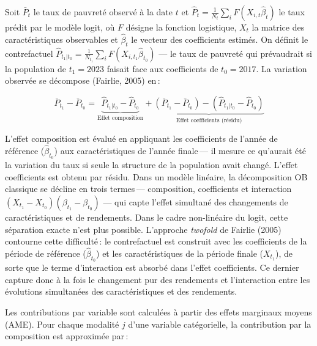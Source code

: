 \documentclass[
  french,
  9pt,
  a4paper,
]{article}
\begin{document}
\begin{tcolorbox}[enhanced jigsaw, leftrule=.75mm, breakable, toptitle=1mm, toprule=.15mm, title={Encadré 3\,--- Formalisation de la décomposition Oaxaca-Blinder}, opacityback=0, arc=.35mm, opacitybacktitle=0.6, colback=white, coltitle=black, colframe=quarto-callout-note-color-frame, left=2mm, colbacktitle=quarto-callout-note-color!10!white, bottomtitle=1mm, titlerule=0mm, rightrule=.15mm, bottomrule=.15mm]

Soit \(\bar{P}_t\) le taux de pauvreté observé à la date \(t\) et
\(\hat{P}_t = \frac{1}{N_t}\sum_i F(X_{i,t} \hat\beta_t)\) le taux
prédit par le modèle logit, où \(F\) désigne la fonction logistique,
\(X_t\) la matrice des caractéristiques observables et \(\hat\beta_t\)
le vecteur des coefficients estimés. On définit le contrefactuel
\(\hat{P}_{t_1|t_0} = \frac{1}{N_{t_1}}\sum_i F(X_{i,t_1} \hat\beta_{t_0})\)
--- le taux de pauvreté qui prévaudrait si la population de
\(t_1 = 2023\) faisait face aux coefficients de \(t_0 = 2017\). La
variation observée se décompose (Fairlie, 2005) en\,:

\[\bar{P}_{t_1} - \bar{P}_{t_0} = \underbrace{\hat{P}_{t_1|t_0} - \hat{P}_{t_0}}_{\text{Effet composition}} + \underbrace{(\bar{P}_{t_1} - \bar{P}_{t_0}) - (\hat{P}_{t_1|t_0} - \hat{P}_{t_0})}_{\text{Effet coefficients (résidu)}}\]

L'effet composition est évalué en appliquant les coefficients de l'année
de référence (\(\hat\beta_{t_0}\)) aux caractéristiques de l'année
finale\,--- il mesure ce qu'aurait été la variation du taux si seule la
structure de la population avait changé. L'effet coefficients est obtenu
par résidu. Dans un modèle linéaire, la décomposition OB classique se
décline en trois termes\,--- composition, coefficients et interaction
\((X_{t_1} - X_{t_0})(\beta_{t_1} - \beta_{t_0})\) --- qui capte l'effet
simultané des changements de caractéristiques et de rendements. Dans le
cadre non-linéaire du logit, cette séparation exacte n'est plus
possible. L'approche \emph{twofold} de Fairlie (2005) contourne cette
difficulté\,: le contrefactuel est construit avec les coefficients de la
période de référence (\(\hat\beta_{t_0}\)) et les caractéristiques de la
période finale (\(X_{t_1}\)), de sorte que le terme d'interaction est
absorbé dans l'effet coefficients. Ce dernier capture donc à la fois le
changement pur des rendements et l'interaction entre les évolutions
simultanées des caractéristiques et des rendements.

Les contributions par variable sont calculées à partir des effets
marginaux moyens (AME). Pour chaque modalité \(j\) d'une variable
catégorielle, la contribution par la composition est approximée par\,:


\end{tcolorbox}
\end{document}
